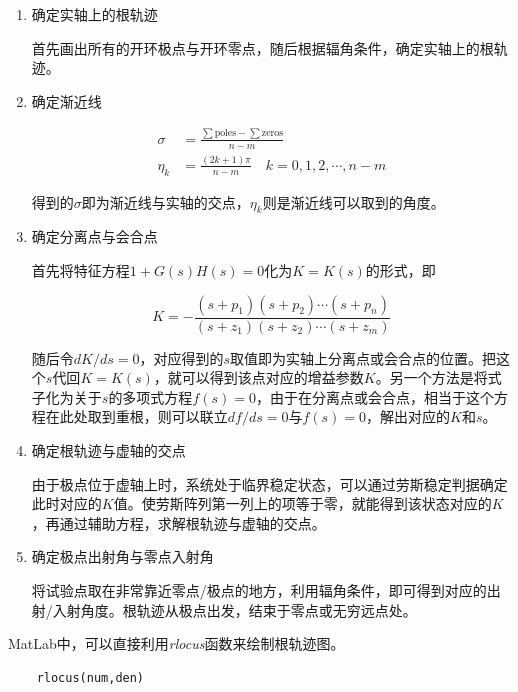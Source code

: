 \begin{enumerate}
    \item 确定实轴上的根轨迹
    
    首先画出所有的开环极点与开环零点，随后根据辐角条件，确定实轴上的根轨迹。

    \item 确定渐近线
    
    \begin{align*}
        \sigma&=\frac{\sum\mbox{poles}-\sum\mbox{zeros}}{n-m}\\
        \eta_k&=\frac{(2k+1)\pi}{n-m}\quad k=0,1,2,\cdots ,n-m
    \end{align*}

    得到的$\sigma$即为渐近线与实轴的交点，$\eta_k$则是渐近线可以取到的角度。

    \item 确定分离点与会合点
    
    首先将特征方程$1+G(s) H(s)=0$化为$K=K(s)$的形式，即

    \begin{equation*}
        K=-\frac{\left(s+p_{1}\right)\left(s+p_{2}\right) \cdots\left(s+p_{n}\right)}{\left(s+z_{1}\right)\left(s+z_{2}\right) \cdots\left(s+z_{m}\right)}
    \end{equation*}

    随后令$dK/ds=0$，对应得到的$s$取值即为实轴上分离点或会合点的位置。把这个$s$代回$K=K(s)$，就可以得到该点对应的增益参数$K$。另一个方法是将式子化为关于$s$的多项式方程$f(s)=0$，由于在分离点或会合点，相当于这个方程在此处取到重根，则可以联立$df/ds=0$与$f(s)=0$，解出对应的$K$和$s$。

    \item 确定根轨迹与虚轴的交点
    
    由于极点位于虚轴上时，系统处于临界稳定状态，可以通过劳斯稳定判据确定此时对应的$K$值。使劳斯阵列第一列上的项等于零，就能得到该状态对应的$K$，再通过辅助方程，求解根轨迹与虚轴的交点。

    \item 确定极点出射角与零点入射角
    
    将试验点取在非常靠近零点/极点的地方，利用辐角条件，即可得到对应的出射/入射角度。根轨迹从极点出发，结束于零点或无穷远点处。

\end{enumerate}

MatLab中，可以直接利用\textit{rlocus}函数来绘制根轨迹图。

\begin{lstlisting}
    rlocus(num,den)
\end{lstlisting}

